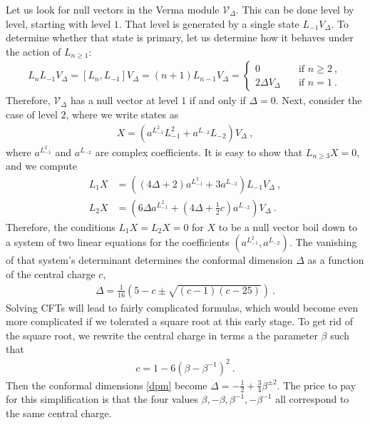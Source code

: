 \documentclass[12pt, a4paper]{article}
\theoremstyle{break}
\begin{document}
Let us look for null vectors in the Verma module $\mathcal{V}_\Delta$. This can be done level by level, starting with level $1$. That level is generated by a single state $L_{-1}V_\Delta$. To determine whether that state is primary, let us determine how it behaves under the action of $L_{n\geq 1}$:
\begin{align}
L_n L_{-1}V_\Delta = [L_n, L_{-1}] V_\Delta = (n+1) L_{n-1}V_\Delta = 
\left\{\begin{array}{ll} 0 &  \quad \text{if } n\geq 2\ , \\ 2\Delta V_\Delta & \quad \text{if } n = 1\ . \end{array}\right. 
\end{align}
Therefore, $\mathcal{V}_\Delta$ has a null vector at level $1$ if and only if $\Delta=0$. Next, consider the case of level $2$, where we write states as 
\begin{align}
 X{} = \left(a^{L_{-1}^2} L_{-1}^2 + a^{L_{-2}} L_{-2}\right) V_\Delta\ ,
\end{align}
where $a^{L_{-1}^2}$ and $a^{L_{-2}}$ are complex coefficients. It is easy to show that $L_{n\geq 3}X{}=0$, and we compute 
\begin{align}
 L_1X{} &= \left((4\Delta+2)a^{L_{-1}^2} + 3a^{L_{-2}}\right) L_{-1}V_\Delta\ ,
 \label{l1c}
\\
L_2 X{} &= \left(6\Delta a^{L_{-1}^2}+(4\Delta+\tfrac12 c) a^{L_{-2}}\right)V_\Delta\ .
\label{l2c}
\end{align}
Therefore, the conditions $L_1X{}=L_2 X{}=0$ for $X{}$ to be a null vector boil down to a system of two linear equations for the coefficients $(a^{L_{-1}^2},a^{L_{-2}})$. The vanishing of that system's determinant determines the conformal dimension $\Delta$ as a function of the central charge $c$,
\begin{align}
 \Delta = \frac{1}{16}\left( 5-c\pm\sqrt{(c-1)(c-25)} \right) \ .
 \label{dpm}
\end{align}
Solving CFTs will lead to fairly complicated formulas, which would become even more complicated if we tolerated a square root at this early stage.
To get rid of the square root, we rewrite the central charge in terms a the parameter $\beta$ such that 
\begin{align}
 \boxed{c = 1- 6\left(\beta - \beta^{-1}\right)^2 } \ .
 \label{cb}
\end{align}
Then the conformal dimensions \eqref{dpm} become 
$
 \Delta = -\frac12 + \frac34\beta^{\pm 2}
$. The price to pay for this simplification is that the four values $\beta,-\beta,\beta^{-1},-\beta^{-1}$ all correspond to the same central charge. 
\end{document}
